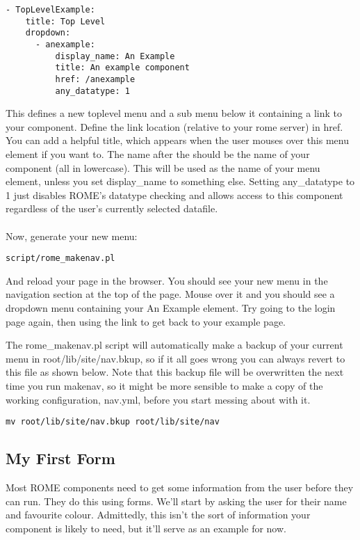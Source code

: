\begin{verbatim}
- TopLevelExample:
    title: Top Level
    dropdown:
      - anexample:
          display_name: An Example
          title: An example component
          href: /anexample
          any_datatype: 1
\end{verbatim}

This defines a new top\-level menu and a sub menu below it containing a link to your component. Define the link location (relative to your rome server) in href. You can add a helpful title, which appears when the user mouses over this menu element if you want to. The name after the \- should be the name of your component (all in lowercase). This will be used as the name of your menu element, unless you set display\_name to something else. Setting any\_datatype to 1 just disables ROME's datatype checking and allows access to this component regardless of the user's currently selected datafile.

\paragraph*{}
Now, generate your new menu:

\begin{verbatim}
script/rome_makenav.pl
\end{verbatim}

And reload your page in the browser. You should see your new menu in the navigation section at the top of the page. Mouse over it and you should see a dropdown menu containing your An Example element. Try going to the login page again, then using the link to get back to your example page. 

The rome\_makenav.pl script will automatically make a backup of your current menu in root/lib/site/nav.bkup, so if it all goes wrong you can always revert to this file as shown below. Note that this backup file will be overwritten the next time you run makenav, so it might be more sensible to make a copy of the working configuration, nav.yml, before you start messing about with it.

\begin{verbatim}
mv root/lib/site/nav.bkup root/lib/site/nav
\end{verbatim}


\subsection{My First Form}
Most ROME components need to get some information from the user before they can run. They do this using forms. We'll start by asking the user for their name and favourite colour. Admittedly, this isn't the sort of information your component is likely to need, but it'll serve as an example for now. 

